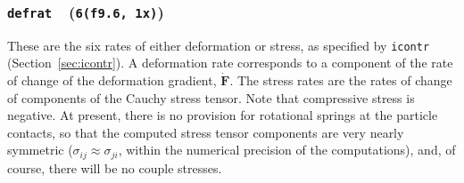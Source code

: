 \documentclass[letterpaper,11pt]{article}
\newcommand{\Var}[2]{\texttt{#1}\ \  (\texttt{#2})}
\begin{document}
\subsubsection[\texttt{defrat}]{\Var{defrat}{6(f9.6, 1x)}}\label{sec:defrat}
These are the six rates of either deformation or stress,
as specified by \texttt{icontr} (Section~\ref{sec:icontr}).
A deformation rate corresponds to a component of the rate of change of
the deformation gradient, $\dot{\mathbf{F}}$.
The stress rates are the rates of change of components of the
Cauchy stress tensor.
Note that compressive stress is negative.
At present, there is no provision for rotational springs at the particle
contacts, so that the computed stress tensor components are very nearly
symmetric ($\sigma_{ij}\approx\sigma_{ji}$, within
the numerical precision of the computations), and, of course,
there will be no couple stresses.
%
\end{document}
